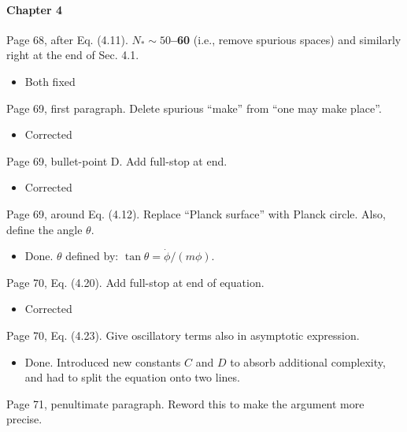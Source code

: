 \documentclass[11pt]{article}
\newcommand{\todo}[1]{{\color{red} #1}}
\begin{document}
\paragraph{Chapter 4}
\begin{enumerate}
\item Page 68, after Eq. (4.11). $N_\ast \sim 50$\textbf{--60} (i.e.,
  remove spurious spaces) and similarly right at the end of Sec. 4.1.
  \begin{itemize}
    \item Both fixed
  \end{itemize}
\item Page 69, first paragraph. Delete spurious ``make'' from ``one
  may make place''.
  \begin{itemize}
    \item Corrected
  \end{itemize}
\item Page 69, bullet-point D. Add full-stop at end.
  \begin{itemize}
    \item Corrected
  \end{itemize}
\item Page 69, around Eq. (4.12). Replace ``Planck surface'' with
  Planck circle. Also, define the angle $\theta$.
  \begin{itemize}
      \item Done. $\theta$ defined by: \(\tan\theta  = \dot{\phi}/(m\phi)\).
  \end{itemize}
\item Page 70, Eq. (4.20). Add full-stop at end of equation.
  \begin{itemize}
    \item Corrected
  \end{itemize}
\item Page 70, Eq. (4.23). Give oscillatory terms also in asymptotic
  expression.
  \begin{itemize}
    \item Done. Introduced new constants $C$ and $D$ to absorb additional complexity, and had to split the equation onto two lines.
  \end{itemize}
\todo{
\item Page 71, penultimate paragraph. Reword this to make the argument
  more precise.
}
\end{enumerate}
\end{document}
